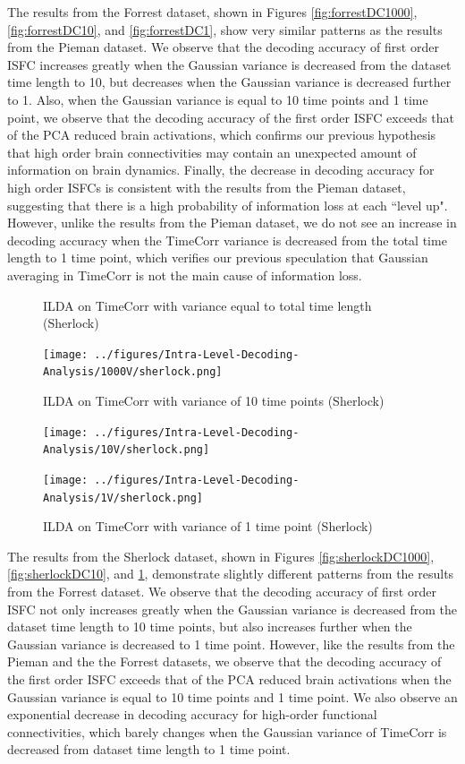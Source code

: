 \documentclass[11pt]{article}
\begin{document}
The results from the Forrest dataset, shown in Figures \ref{fig:forrestDC1000}, \ref{fig:forrestDC10}, and \ref{fig:forrestDC1}, show very similar patterns as the results from the Pieman dataset. We observe that the decoding accuracy of first order ISFC increases greatly when the Gaussian variance is decreased from the dataset time length to 10, but decreases when the Gaussian variance is decreased further to 1. Also, when the Gaussian variance is equal to 10 time points and 1 time point, we observe that the decoding accuracy of the first order ISFC exceeds that of the PCA reduced brain activations, which confirms our previous hypothesis that high order brain connectivities may contain an unexpected amount of information on brain dynamics. Finally, the decrease in decoding accuracy for high order ISFCs is consistent with the results from the Pieman dataset, suggesting that there is a high probability of information loss at each ``level up". However, unlike the results from the Pieman dataset, we do not see an increase in decoding accuracy when the TimeCorr variance is decreased from the total time length to 1 time point, which verifies our previous speculation that Gaussian averaging in TimeCorr is not the main cause of information loss.

\begin{figure}[!htb]
\caption{ILDA on TimeCorr with variance equal to total time length (Sherlock)}
\centering
\texttt{[image: ../figures/Intra-Level-Decoding-Analysis/1000V/sherlock.png]}
\label{fig:sherlockDC1000}
\caption{ILDA on TimeCorr with variance of 10 time points (Sherlock)}
\centering
\texttt{[image: ../figures/Intra-Level-Decoding-Analysis/10V/sherlock.png]}
\label{fig:sherlockDC10}
\caption{ILDA on TimeCorr with variance of 1 time point (Sherlock)}
\centering
\texttt{[image: ../figures/Intra-Level-Decoding-Analysis/1V/sherlock.png]}
\label{fig:sherlockDC1}
\end{figure}

The results from the Sherlock dataset, shown in Figures \ref{fig:sherlockDC1000}, \ref{fig:sherlockDC10}, and \ref{fig:sherlockDC1}, demonstrate slightly different patterns from the results from the Forrest dataset. We observe that the decoding accuracy of first order ISFC not only increases greatly when the Gaussian variance is decreased from the dataset time length to 10 time points, but also increases further when the Gaussian variance is decreased to 1 time point. However, like the results from the Pieman and the the Forrest datasets, we observe that the decoding accuracy of the first order ISFC exceeds that of the PCA reduced brain activations when the Gaussian variance is equal to 10 time points and 1 time point. We also observe an exponential decrease in decoding accuracy for high-order functional connectivities, which barely changes when the Gaussian variance of TimeCorr is decreased from dataset time length to 1 time point.
\end{document}
